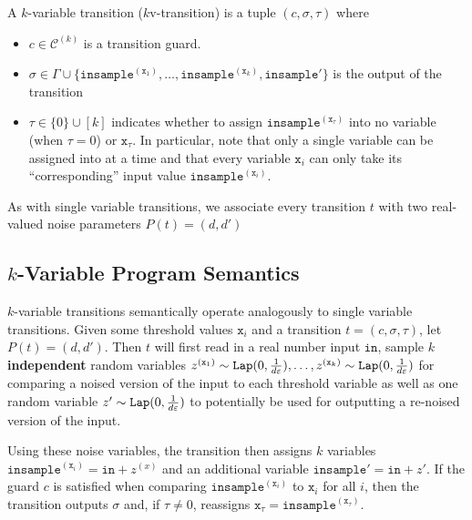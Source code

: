 
\begin{defn}
    A $k$-variable transition ($k$v-transition) is a tuple $(c, \sigma, \tau)$ where \begin{itemize}
        \item $c\in\mathcal{C}^{(k)}$ is a transition guard.
        \item $\sigma\in\Gamma\cup\{\texttt{insample}^{(\texttt{x}_1)}, \ldots, \texttt{insample}^{(\texttt{x}_k)}, \texttt{insample}'\}$ is the output of the transition
        \item $\tau \in \{0\} \cup [k]$ indicates whether to assign $\texttt{insample}^{(\texttt{x}_\tau)}$ into no variable (when $\tau = 0$) or $\texttt{x}_\tau$. In particular, note that only a single variable can be assigned into at a time and that every variable $\texttt{x}_i$ can only take its ``corresponding'' input value $\texttt{insample}^{(\texttt{x}_i)}$. 
    \end{itemize}
\end{defn}

As with single variable transitions, we associate every transition $t$ with two real-valued noise parameters $P(t) = (d, d')$

\subsection{$k$-Variable Program Semantics}

$k$-variable transitions semantically operate analogously to single variable transitions. Given some threshold values $\texttt{x}_i$ and a transition $t = (c, \sigma, \tau)$, let $P(t) = (d, d')$. Then $t$ will first read in a real number input $\texttt{in}$, 
sample $k$ \textbf{independent} random variables $z^{(\texttt{x}_1)}\sim\texttt{Lap}(0, \frac{1}{d\varepsilon}),\ldots, z^{(\texttt{x}_k)}\sim\texttt{Lap}(0, \frac{1}{d\varepsilon})$ for comparing a noised version of the input to each threshold variable as well as one random variable $z' \sim\texttt{Lap}(0, \frac{1}{d\varepsilon})$ to potentially be used for outputting a re-noised version of the input. 

Using these noise variables, the transition then assigns $k$ variables $\texttt{insample}^{(\texttt{x}_i)} = \texttt{in} + z^{(x)}$ and an additional variable $\texttt{insample}' = \texttt{in} + z'$. 
If the guard $c$ is satisfied when comparing $\texttt{insample}^{(\texttt{x}_i)}$ to $\texttt{x}_i$ for all $i$, then the transition outputs $\sigma$ and, if $\tau\neq 0$, reassigns $\texttt{x}_{\tau} = \texttt{insample}^{(\texttt{x}_\tau)}$.

